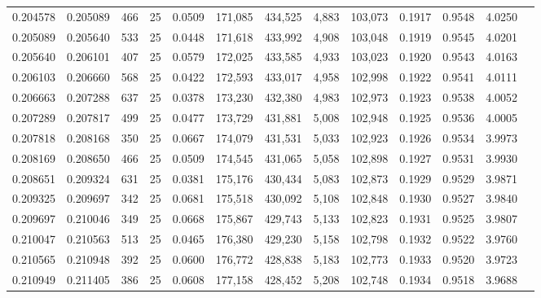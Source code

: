 \begin{tabular}{rrrrrrrrrrrrr}
0.204578 & 0.205089 &   466 &  25 &                                     0.0509 & 171,085 & 434,525 &   4,883 & 103,073 & 0.1917 & 0.9548 & 4.0250 \\
0.205089 & 0.205640 &   533 &  25 &                                     0.0448 & 171,618 & 433,992 &   4,908 & 103,048 & 0.1919 & 0.9545 & 4.0201 \\
0.205640 & 0.206101 &   407 &  25 &                                     0.0579 & 172,025 & 433,585 &   4,933 & 103,023 & 0.1920 & 0.9543 & 4.0163 \\
0.206103 & 0.206660 &   568 &  25 &                                     0.0422 & 172,593 & 433,017 &   4,958 & 102,998 & 0.1922 & 0.9541 & 4.0111 \\
0.206663 & 0.207288 &   637 &  25 &                                     0.0378 & 173,230 & 432,380 &   4,983 & 102,973 & 0.1923 & 0.9538 & 4.0052 \\
0.207289 & 0.207817 &   499 &  25 &                                     0.0477 & 173,729 & 431,881 &   5,008 & 102,948 & 0.1925 & 0.9536 & 4.0005 \\
0.207818 & 0.208168 &   350 &  25 &                                     0.0667 & 174,079 & 431,531 &   5,033 & 102,923 & 0.1926 & 0.9534 & 3.9973 \\
0.208169 & 0.208650 &   466 &  25 &                                     0.0509 & 174,545 & 431,065 &   5,058 & 102,898 & 0.1927 & 0.9531 & 3.9930 \\
0.208651 & 0.209324 &   631 &  25 &                                     0.0381 & 175,176 & 430,434 &   5,083 & 102,873 & 0.1929 & 0.9529 & 3.9871 \\
0.209325 & 0.209697 &   342 &  25 &                                     0.0681 & 175,518 & 430,092 &   5,108 & 102,848 & 0.1930 & 0.9527 & 3.9840 \\
0.209697 & 0.210046 &   349 &  25 &                                     0.0668 & 175,867 & 429,743 &   5,133 & 102,823 & 0.1931 & 0.9525 & 3.9807 \\
0.210047 & 0.210563 &   513 &  25 &                                     0.0465 & 176,380 & 429,230 &   5,158 & 102,798 & 0.1932 & 0.9522 & 3.9760 \\
0.210565 & 0.210948 &   392 &  25 &                                     0.0600 & 176,772 & 428,838 &   5,183 & 102,773 & 0.1933 & 0.9520 & 3.9723 \\
0.210949 & 0.211405 &   386 &  25 &                                     0.0608 & 177,158 & 428,452 &   5,208 & 102,748 & 0.1934 & 0.9518 & 3.9688 \\

\end{tabular}
